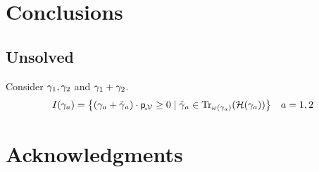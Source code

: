 \documentclass[aps, 10pt, english, twoside, twocolumn, pra, nofootinbib, tightenlines, longbibliography, superscriptaddress]{revtex4-1}
\begin{document}
    \section{Conclusions}

    \subsection{Unsolved}
    Consider $\gamma_{1}, \gamma_{2}$ and $\gamma_{1} + \gamma_{2}$.
    \[ I\br{\ga_a} = \bc{\br{\ga_{a} + \ti \ga_{a}} \cdot \prob{\mscenariowrap} \geq 0 \mid \ti \ga_{a} \in \transversals{\w\br{\ga_a}}{\hypergraph\br{\ga_a}}} \quad a = 1,2 \]

    \section*{Acknowledgments}

    \setlength{\bibsep}{3pt plus 3pt minus 2pt}
    
    \nocite{apsrev41Control}
    
\end{document}

